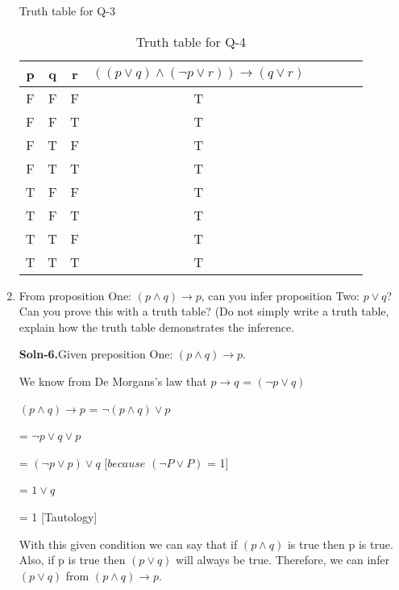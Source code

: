 \documentclass{article}
\begin{document}
\begin{enumerate}
\begin{table} [H]
                \caption{Truth table for Q-3}
                \label {table:4}
        \end{table}
        \begin{table} [H]
                \centering
                \begin{tabular}{ | c | c | c | c | c | c | c | c | }
                \hline
                \textbf{p} & \textbf{q} & \textbf{r} & \textbf{$((p \vee q) \wedge (\neg p \vee r)) \rightarrow (q \vee r)$} \\ [0.5 ex]
                \hline 
                F & F & F & T \\
                \hline
                F & F & T & T \\
                \hline
                F & T & F & T \\
                \hline
                F & T & T & T \\
                \hline
                T & F & F & T \\
                \hline
                T & F & T & T \\
                \hline
                T & T & F & T \\
                \hline
                T & T & T & T \\ [1ex]
                \hline
                \end{tabular}
                \caption{Truth table for Q-4}
                \label {table:5}
        \end{table}

\item   From proposition One: $(p \wedge q) \rightarrow p$, can you infer
        proposition Two: $p \vee q$?  Can you prove this with a truth
        table?  (Do not simply write a truth table, explain how the
        truth table demonstrates the inference.

        \textbf{Soln-6.}Given preposition One: $(p \wedge q) \rightarrow p$. \par
                        We know from De Morgans’s law that $p \rightarrow q$ = $(\neg p \vee q)$ \par
                        $(p \wedge q) \rightarrow p$ = $\neg (p \wedge q) \vee p$ \par
                                     = $\neg p \vee q \vee p$ \par
                                     = $(\neg p \vee p) \vee q$ [$ because $ $(\neg P \vee P)$ = 1] \par
                                     = $1 \vee q$ \par
                                     = 1 [Tautology] \par
        With this given condition we can say that if $(p \wedge q)$ is true then p is true. 
        Also, if p is true then $(p \vee q)$ will always be true. Therefore, we can infer $(p \vee q)$ from $(p \wedge q) \rightarrow p$.


\end{enumerate}
\end{document}
